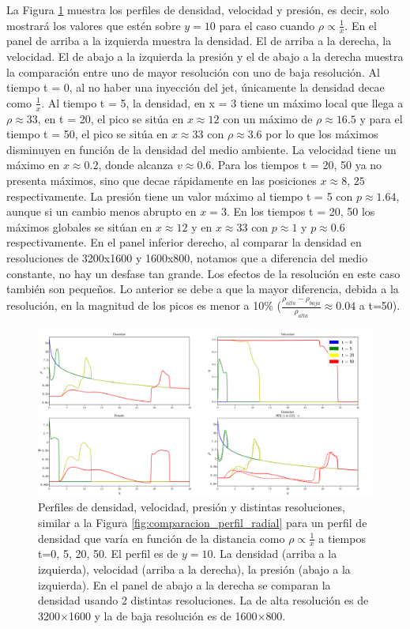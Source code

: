 \documentclass[12pt,a4paper]{book}
\begin{document}
La Figura \ref{fig:Decaimiento_lineal_densidad_jet} muestra los perfiles de densidad, velocidad y presión, es decir, solo mostrará los valores que estén sobre $y = 10$ {para el caso cuando $\rho \varpropto \frac{1}{x}$}. En el panel de arriba 
a la izquierda  muestra la densidad. El de arriba a la derecha, la velocidad. El de abajo a la izquierda la presión y 
el de abajo a la derecha muestra la comparación entre
uno de mayor resolución con uno de baja resolución. Al tiempo t = 0, al no haber una inyección del jet, únicamente la densidad 
decae como $\frac{1}{x}$. Al tiempo t = 5, la densidad, en x = 3 tiene un máximo local que llega a 
$\rho  \approx 33$, en t = 20, el pico se sitúa en $x \approx 12$ con un máximo de 
$\rho  \approx 16.5$ y para el 
tiempo t = 50, el pico se sitúa en $x \approx 33$ con $\rho  \approx 3.6$ por lo que los máximos disminuyen en función de la 
densidad del medio ambiente.
La velocidad tiene un máximo en $x \approx 0.2$, donde alcanza  $v \approx 0.6$. Para los tiempos t = 20, 50 ya no 
presenta máximos, sino que decae rápidamente en las posiciones $x \approx 8, \, 25$ respectivamente.
La presión tiene un valor máximo al tiempo t = 5 con $p \approx 1.64$, aunque si un cambio menos abrupto en $x = 3$. 
En los tiempos t = 20, 50 los máximos globales se sitúan en $x \approx 12$ y en $x \approx 33$ 
con $p \approx  1$ y $p  \approx 0.6$ respectivamente.
En el panel inferior derecho, al comparar la densidad en resoluciones de 3200x1600 y 1600x800,
notamos que a diferencia del medio constante, no hay un desfase tan grande.  Los efectos de la resolución en este caso 
también son pequeños. Lo anterior se debe a que la mayor diferencia, debida a la resolución, 
en la magnitud de los picos es menor a 10\% ($\frac{\rho_{alta} - \rho_{baja}}{\rho_{alta}} \approx 0.04$ a t=50). 

\begin{figure}
  \centering
  \includegraphics[width = 1.0\textwidth]{./Figuras/jet/perfiles/perfiles_lineales.png}
  \caption{Perfiles de densidad, velocidad, presión y distintas resoluciones, similar a la Figura 
  \ref{fig:comparacion_perfil_radial} para un perfil de densidad que varía en función de la distancia como
  $\rho \varpropto \frac{1}{x}$ a tiempos t=0, 5, 20, 50.
  El perfil es de $y = 10$.
  La densidad (arriba a la izquierda), velocidad (arriba a la derecha), la presión (abajo a la izquierda). 
  En el panel de abajo a la derecha se comparan la densidad usando 2 distintas resoluciones. La de alta resolución
  es de 3200$\times$1600 y la de baja resolución es de 1600$\times$800.}\label{fig:Decaimiento_lineal_densidad_jet}
\end{figure}
\end{document}

